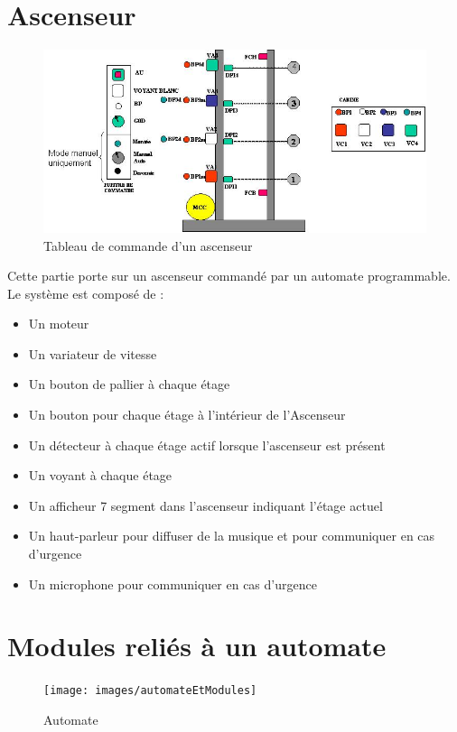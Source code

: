 \documentclass[11pt, multicol]{article}
\begin{document}
\section{Ascenseur}
\resetNumQuestion
\begin{figure}[h!t]
	\centering
	\includegraphics[width=.5\linewidth]{images/ascenseur}
	\caption{Tableau de commande d'un ascenseur}
\end{figure}
Cette partie porte sur un ascenseur commandé par un automate programmable.
Le système est composé de :
\begin{itemize}
	\item Un moteur
	\item Un variateur de vitesse
	\item Un bouton de pallier à chaque étage
	\item Un bouton pour chaque étage à l'intérieur de l'Ascenseur
	\item Un détecteur à chaque étage actif lorsque l'ascenseur est présent
	\item Un voyant à chaque étage
	\item Un afficheur 7 segment dans l'ascenseur indiquant l'étage actuel
	\item Un haut-parleur pour diffuser de la musique et pour communiquer en cas d'urgence
	\item Un microphone pour communiquer en cas d'urgence
\end{itemize}


\pagebreak
\section{Modules reliés à un automate}
\resetNumQuestion
\begin{figure}[h!b]
\centering
	\texttt{[image: images/automateEtModules]}
	\caption{Automate}
	\label{fig:automate}
\end{figure}
\end{document}
